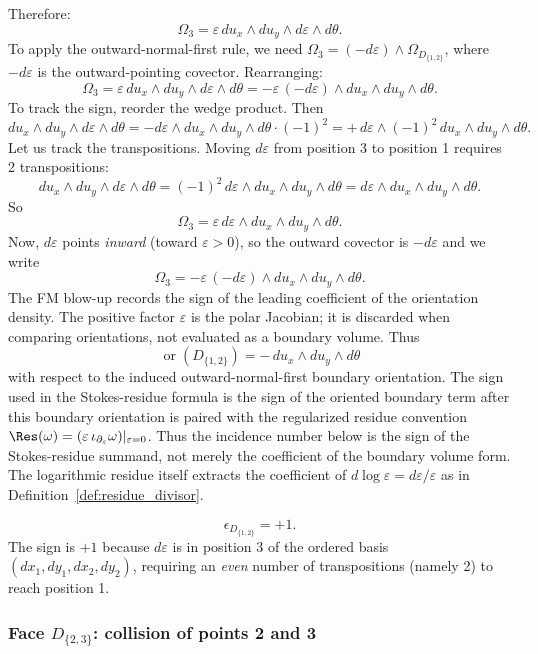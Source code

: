 Therefore:
\[
\Omega_3 = \varepsilon\, du_x\wedge du_y\wedge d\varepsilon\wedge d\theta.
\]
To apply the outward-normal-first rule, we need $\Omega_3 = (-d\varepsilon)\wedge\Omega_{D_{\{1,2\}}}$, where $-d\varepsilon$ is the outward-pointing covector. Rearranging:
\[
\Omega_3 = \varepsilon\,du_x\wedge du_y\wedge d\varepsilon\wedge d\theta = -\varepsilon\,(-d\varepsilon)\wedge du_x\wedge du_y\wedge d\theta.
\]
To track the sign, reorder the wedge product. Then
\[
du_x\wedge du_y\wedge d\varepsilon\wedge d\theta = -d\varepsilon\wedge du_x\wedge du_y\wedge d\theta \cdot (-1)^2 = +\,d\varepsilon\wedge (-1)^2\, du_x\wedge du_y\wedge d\theta.
\]
Let us track the transpositions. Moving $d\varepsilon$ from position 3 to position 1 requires 2 transpositions:
\[
du_x\wedge du_y \wedge d\varepsilon\wedge d\theta = (-1)^2\,d\varepsilon\wedge du_x\wedge du_y\wedge d\theta = d\varepsilon\wedge du_x\wedge du_y\wedge d\theta.
\]
So
\[
\Omega_3 = \varepsilon\,d\varepsilon\wedge du_x\wedge du_y\wedge d\theta.
\]
Now, $d\varepsilon$ points \emph{inward} (toward $\varepsilon > 0$), so the outward covector is $-d\varepsilon$ and we write
\[
\Omega_3 = -\varepsilon\,(-d\varepsilon)\wedge du_x\wedge du_y\wedge d\theta.
\]
The FM blow-up records the sign of the leading coefficient of the
orientation density.  The positive factor \(\varepsilon\) is the polar
Jacobian; it is discarded when comparing orientations, not evaluated
as a boundary volume.  Thus
\[
\operatorname{or}(D_{\{1,2\}})
=-\,du_x\wedge du_y\wedge d\theta
\]
with respect to the induced outward-normal-first boundary orientation.
The sign used in the Stokes-residue formula is the sign of the
oriented boundary term after this boundary orientation is paired with
the regularized residue convention
\(\Res(\omega)=(\varepsilon\,\iota_{\partial_\varepsilon}\omega)
|_{\varepsilon=0}\).
Thus the incidence number below is the sign of the Stokes-residue
summand, not merely the coefficient of the boundary volume form.  The
logarithmic residue itself extracts the coefficient of
\(d\log\varepsilon=d\varepsilon/\varepsilon\) as in
Definition~\ref{def:residue_divisor}.

\begin{equation}
\label{eq:eps-D12}
\boxed{\epsilon_{D_{\{1,2\}}} = +1.}
\end{equation}
The sign is $+1$ because $d\varepsilon$ is in position 3 of the ordered basis $(dx_1,dy_1,dx_2,dy_2)$, requiring an \emph{even} number of transpositions (namely 2) to reach position 1.

\subsubsection{\texorpdfstring{Face $D_{\{2,3\}}$: collision of points 2 and 3}{Face D23: collision of points 2 and 3}}


